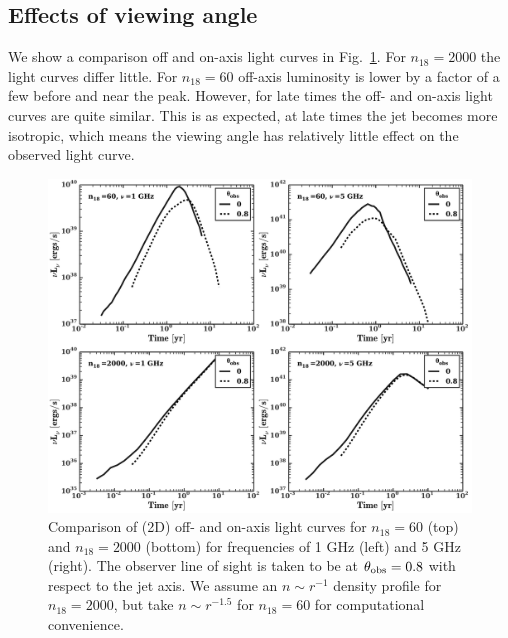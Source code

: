 \documentclass[usenatbib,fleqn]{mnras}
\begin{document}
\subsection{Effects of viewing angle}
We show a comparison off and on-axis light curves in
Fig.~\ref{fig:onOff}.  For $n_{18}=2000$ the light curves differ
little.  For $n_{18}=60$ off-axis luminosity is lower by a factor of a few
before and near the peak. However, for late times
the off- and on-axis light curves are quite similar. This is as
expected, at late times the jet becomes more isotropic, which means
the viewing angle has relatively little effect on the observed light curve.

\begin{figure}
\includegraphics[width=16cm]{on_off.pdf}
\caption{\label{fig:onOff} Comparison of (2D) off- and on-axis
  light curves for $n_{18}=60$ (top) and $n_{18}=2000$ (bottom) for
  frequencies of 1 GHz (left) and 5 GHz (right). The observer line of
  sight is taken to be at $\theta_{\rm obs}=0.8$ with respect to the
  jet axis. We assume an $n\sim r^{-1}$ density profile for
  $n_{18}=2000$, but take $n\sim r^{-1.5}$ for $n_{18}=60$ for
  computational convenience.}
\end{figure}

\end{document}
